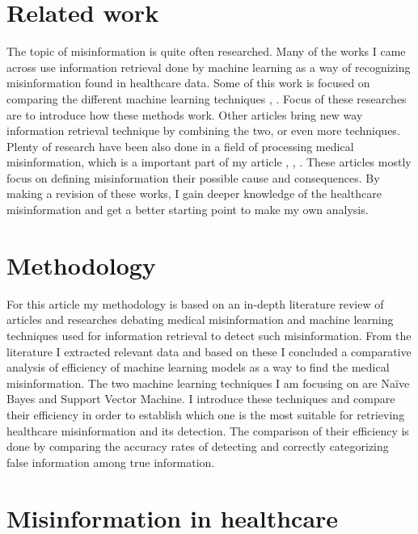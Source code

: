 \documentclass[11pt ,english,a4paper]{article}
\begin{document}
\section{Related work}

The topic of misinformation is quite often researched. Many of the works I came across use information retrieval done by machine learning as a way of recognizing misinformation found in healthcare data. Some of this work is focused on comparing the different machine learning techniques \cite{sha20mach}, \cite{pod19mach}. Focus of these researches are to introduce how these methods work. Other articles bring new way information retrieval technique \cite{chap22unmask} by combining the two, or even more techniques. Plenty of research have been also done in a field of processing medical misinformation, which is a important part of my article \cite{gu20misinfo}, \cite{cook15misinfo}, \cite{wa19sys}. These articles mostly focus on defining misinformation their possible cause and consequences. By making a revision of these works, I gain deeper knowledge of the healthcare misinformation and get a better starting point to make my own analysis.

\section{Methodology}\label{methodology}

For this article my methodology is based on an in-depth literature review of articles and researches debating medical misinformation and machine learning techniques used for information retrieval to detect such misinformation. From the literature I extracted relevant data and based on these I concluded a comparative analysis of efficiency of machine learning models as a way to find the medical misinformation. The two machine learning techniques I am focusing on are Naïve Bayes and Support Vector Machine. I introduce these techniques and compare their efficiency in order to establish which one is the most suitable for retrieving healthcare misinformation and its detection. The comparison of their efficiency is done by comparing the accuracy rates of detecting and correctly categorizing false information among true information. 

\section{Misinformation in healthcare}\label{mih}
\end{document}
